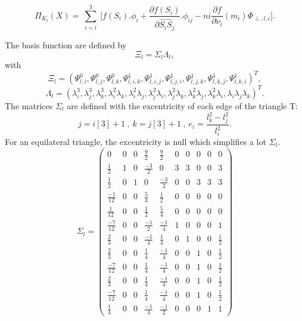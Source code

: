 \documentclass[proc]{edpsmath}
\begin{document}
\begin{equation*}
\Pi_{K_l} (X) = \sum \limits_{\substack{i=l }}^{3}{ [f(S_i).\phi_i +  \frac{\partial f(S_i)}{\partial  \overrightarrow{ S_i S_j } }.\phi_{ij} }   - ni \frac{\partial f}{\partial \nu_i}(m_i) \Phi_{\perp,l,i}].
\end{equation*} 

The basis function are defined by 
\begin{equation*}
\Xi_l =  \Sigma_l \Lambda_l,
\end{equation*} 
 \noindent with
\begin{equation*}
  \Xi_l=(\Psi_{l,i}^0, \Psi_{l,j}^0, \Psi_{l,k}^0, \Psi_{l,i,k}^1,\Psi_{l,i,j}^1,\Psi_{l,j,i}^1,\Psi_{l,j,k}^1 ,\Psi_{l,k,j}^1,\Psi_{l,k,i}^1)^T,
\end{equation*} 
\begin{equation*}
  \Lambda_l = ( \lambda_i^3,\lambda_j^3,\lambda_k^3,\lambda_i^2\lambda_k,\lambda_i^2\lambda_j,\lambda_j^2\lambda_i,\lambda_j^2\lambda_k,\lambda_k^2\lambda_j,\lambda_k^2\lambda_i,\lambda_i\lambda_j\lambda_k)^T.
\end{equation*}  
  \noindent The matrices $\Sigma_l$ are defined with the excentricity of each edge of the triangle T: 
\begin{equation*}
j=i[3]+1 ~,~ k=j[3]+1~,~ e_i = \frac{l_k^2 - l_j^2}{l_i^2}.
\end{equation*} 
For an equilateral triangle, the excentricity is null which simplifies a lot $\Sigma_l$.
\begin{equation*}
\Sigma_l = 
\begin{pmatrix}
	0 & 0 & 0 & \frac{9}{2} & \frac{9}{2} & 0 & 0 & 0 & 0 & 0  \\
	\frac{1}{2} & 1 & 0 & \frac{-3}{2} & 0 & 3 & 3 & 0 & 0 & 3 \\
	\frac{1}{2} & 0 & 1 & 0 & \frac{-3}{2} & 0 & 0 & 3 & 3 & 3 \\	 
	\frac{-1}{12} & 0 & 0 & \frac{ 5}{4} & \frac{ 1}{2} & 0 & 0 & 0 & 0 & 0 \\	 
	\frac{ 1}{12} & 0 & 0 & \frac{ 1}{2} & \frac{ 5}{4} & 0 & 0 & 0 & 0 & 0 \\
	\frac{-7}{12} & 0 & 0 & \frac{-1}{2} & \frac{-1}{4} & 1 & 0 & 0 & 0 & 1 \\
    \frac{ 2}{3}& 0 & 0 & \frac{-1}{4} & \frac{ 1}{4} & 0 & 1 & 0 & 0 & \frac{1}{2} \\
	\frac{ 2}{3}& 0 & 0 & \frac{ 1}{4} & \frac{-1}{4} & 0 & 0 & 1 & 0 & \frac{1}{2} \\
    \frac{-7}{12} & 0 & 0 & \frac{ 1}{4} & \frac{-1}{4} & 0 & 0 & 1 & 0 & \frac{1}{2} \\
	\frac{ 2}{3}& 0 & 0 & \frac{ 1}{4} & \frac{-1}{4} & 0 & 0 & 1 & 0 & \frac{1}{2} \\
    \frac{-7}{12} & 0 & 0 & \frac{ 1}{4} & \frac{-1}{4} & 0 & 0 & 1 & 0 & \frac{1}{2} \\
	\frac{1}{4} & 0 & 0 & \frac{-1}{4} & \frac{-1}{2} & 0 & 0 & 0 & 1 & 1 
\end{pmatrix}
\end{equation*}
\end{document}

